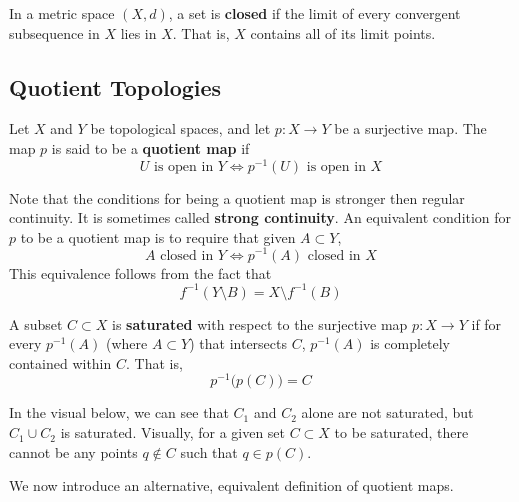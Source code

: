 \documentclass{article}
\begin{document}
    \begin{proposition}
    In a metric space $(X, d)$, a set is \textbf{closed} if the limit of every convergent subsequence in $X$ lies in $X$. That is, $X$ contains all of its limit points. 
    \end{proposition}

  \subsection{Quotient Topologies}

    \begin{definition}
    Let $X$ and $Y$ be topological spaces, and let $p: X \longrightarrow Y$ be a surjective map. The map $p$ is said to be a \textbf{quotient map} if
    \[U \text{ is open in } Y \iff p^{-1}(U) \text{ is open in } X\]
    \end{definition}

    Note that the conditions for being a quotient map is stronger then regular continuity. It is sometimes called \textbf{strong continuity}. An equivalent condition for $p$ to be a quotient map is to require that given $A \subset Y$, 
    \[A \text{ closed in } Y \iff p^{-1}(A) \text{ closed in } X\]
    This equivalence follows from the fact that
    \[f^{-1}(Y \setminus B) = X \setminus f^{-1}(B)\]

    \begin{definition}
    A subset $C \subset X$ is \textbf{saturated} with respect to the surjective map $p: X \longrightarrow Y$ if for every $p^{-1} (A)$ (where $A \subset Y$) that intersects $C$, $p^{-1}(A)$ is completely contained within $C$. That is, 
    \[p^{-1} \big( p(C) \big) = C\]
    \end{definition}

    In the visual below, we can see that $C_1$ and $C_2$ alone are not saturated, but $C_1 \cup C_2$ is saturated. Visually, for a given set $C \subset X$ to be saturated, there cannot be any points $q \not\in C$ such that $q \in p(C)$. 

    \begin{center}
    \end{center}
    We now introduce an alternative, equivalent definition of quotient maps. 
\end{document}
